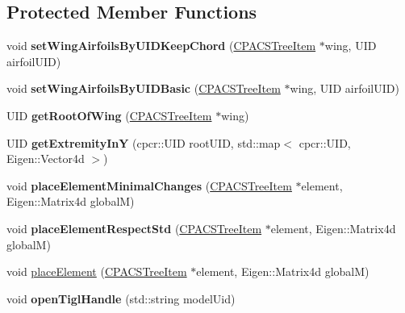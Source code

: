\subsection*{Protected Member Functions}
\begin{DoxyCompactItemize}
\item 
\hypertarget{classcpcr_1_1AircraftTree_a49200cf63bc3875e7634357d0576dfcf}{void {\bfseries set\-Wing\-Airfoils\-By\-U\-I\-D\-Keep\-Chord} (\hyperlink{classcpcr_1_1CPACSTreeItem}{C\-P\-A\-C\-S\-Tree\-Item} $\ast$wing, U\-I\-D airfoil\-U\-I\-D)}\label{classcpcr_1_1AircraftTree_a49200cf63bc3875e7634357d0576dfcf}

\item 
\hypertarget{classcpcr_1_1AircraftTree_ac3ac46fa7321d6cb85eb976de0e1905d}{void {\bfseries set\-Wing\-Airfoils\-By\-U\-I\-D\-Basic} (\hyperlink{classcpcr_1_1CPACSTreeItem}{C\-P\-A\-C\-S\-Tree\-Item} $\ast$wing, U\-I\-D airfoil\-U\-I\-D)}\label{classcpcr_1_1AircraftTree_ac3ac46fa7321d6cb85eb976de0e1905d}

\item 
\hypertarget{classcpcr_1_1AircraftTree_a599d0ce228bb15db40e292417e13b872}{U\-I\-D {\bfseries get\-Root\-Of\-Wing} (\hyperlink{classcpcr_1_1CPACSTreeItem}{C\-P\-A\-C\-S\-Tree\-Item} $\ast$wing)}\label{classcpcr_1_1AircraftTree_a599d0ce228bb15db40e292417e13b872}

\item 
\hypertarget{classcpcr_1_1AircraftTree_a046f619d04c98bab6d04674271434035}{U\-I\-D {\bfseries get\-Extremity\-In\-Y} (cpcr\-::\-U\-I\-D root\-U\-I\-D, std\-::map$<$ cpcr\-::\-U\-I\-D, Eigen\-::\-Vector4d $>$)}\label{classcpcr_1_1AircraftTree_a046f619d04c98bab6d04674271434035}

\item 
\hypertarget{classcpcr_1_1AircraftTree_aee6abd453fb7b2ce063df47586adf99d}{void {\bfseries place\-Element\-Minimal\-Changes} (\hyperlink{classcpcr_1_1CPACSTreeItem}{C\-P\-A\-C\-S\-Tree\-Item} $\ast$element, Eigen\-::\-Matrix4d global\-M)}\label{classcpcr_1_1AircraftTree_aee6abd453fb7b2ce063df47586adf99d}

\item 
\hypertarget{classcpcr_1_1AircraftTree_ace86833969231ac0e2c5043b9b3fa3b2}{void {\bfseries place\-Element\-Respect\-Std} (\hyperlink{classcpcr_1_1CPACSTreeItem}{C\-P\-A\-C\-S\-Tree\-Item} $\ast$element, Eigen\-::\-Matrix4d global\-M)}\label{classcpcr_1_1AircraftTree_ace86833969231ac0e2c5043b9b3fa3b2}

\item 
void \hyperlink{classcpcr_1_1AircraftTree_aff7e38fe83c5c04be75d5991ea6af226}{place\-Element} (\hyperlink{classcpcr_1_1CPACSTreeItem}{C\-P\-A\-C\-S\-Tree\-Item} $\ast$element, Eigen\-::\-Matrix4d global\-M)
\item 
\hypertarget{classcpcr_1_1AircraftTree_adabbf01ccf31be1d7dd8e6423015a09e}{void {\bfseries open\-Tigl\-Handle} (std\-::string model\-Uid)}\label{classcpcr_1_1AircraftTree_adabbf01ccf31be1d7dd8e6423015a09e}


\end{DoxyCompactItemize}
